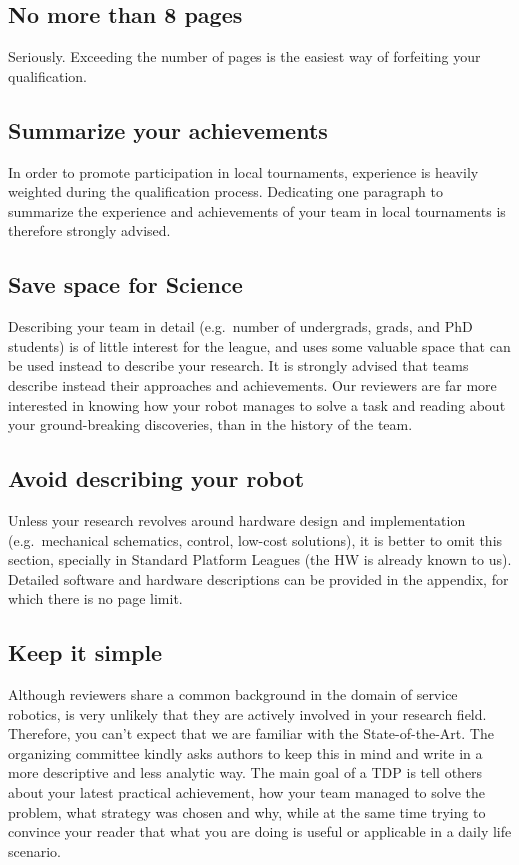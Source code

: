 \documentclass[12pt]{article}
\begin{document}
\subsection{No more than 8 pages}
Seriously. Exceeding the number of pages is the easiest way of forfeiting your qualification.

\subsection{Summarize your achievements}
In order to promote participation in local tournaments, experience is heavily weighted during the qualification process.
Dedicating one paragraph to summarize the experience and achievements of your team in local tournaments is therefore strongly advised.

\subsection{Save space for Science}
Describing your team in detail (e.g.~number of undergrads, grads, and PhD students) is of little interest for the league, and uses some valuable space that can be used instead to describe your research.
It is strongly advised that teams describe instead their approaches and achievements.
Our reviewers are far more interested in knowing how your robot manages to solve a task and reading about your ground-breaking discoveries, than in the history of the team.

\subsection{Avoid describing your robot}
Unless your research revolves around hardware design and implementation (e.g.~mechanical schematics, control, low-cost solutions), it is better to omit this section, specially in Standard Platform Leagues (the HW is already known to us).
Detailed software and hardware descriptions can be provided in the appendix, for which there is no page limit.


\subsection{Keep it simple}
Although reviewers share a common background in the domain of service robotics, is very unlikely that they are actively involved in your research field.
Therefore, you can't expect that we are familiar with the State-of-the-Art.
The organizing committee kindly asks authors to keep this in mind and write in a more descriptive and less analytic way.
The main goal of a TDP is tell others about your latest practical achievement, how your team managed to solve the problem, what strategy was chosen and why, while at the same time trying to convince your reader that what you are doing is useful or applicable in a daily life scenario.
\end{document}
